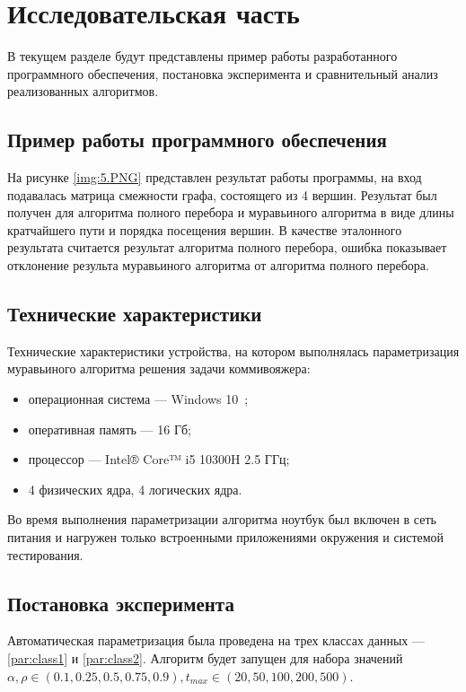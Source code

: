 \chapter{Исследовательская часть}
В текущем разделе будут представлены пример работы разработанного программного обеспечения, постановка эксперимента и сравнительный анализ реализованных алгоритмов.

\section{Пример работы программного обеспечения}

На рисунке \ref{img:5.PNG} представлен результат работы программы, на вход подавалась матрица смежности графа, состоящего из 4 вершин. Результат был получен для алгоритма полного перебора и муравьиного алгоритма в виде длины кратчайшего пути и порядка посещения вершин. В качестве эталонного результата считается результат алгоритма полного перебора, ошибка показывает отклонение результа муравьиного алгоритма от алгоритма полного перебора.

\clearpage

\section{Технические характеристики}

Технические характеристики устройства, на котором выполнялась параметризация муравьиного алгоритма решения задачи коммивояжера:

\begin{itemize}
	\item операционная система --- Windows 10~\cite{windows10};
	\item оперативная память --- 16 Гб;
	\item процессор --- Intel® Core™ i5 10300H 2.5 ГГц;
	\item 4 физических ядра, 4 логических ядра.
\end{itemize}

Во время выполнения параметризации алгоритма ноутбук был включен в сеть питания и нагружен только встроенными приложениями окружения и системой тестирования.

\section{Постановка эксперимента}

Автоматическая параметризация была проведена на трех классах данных --- \ref{par:class1} и \ref{par:class2}. Алгоритм будет запущен для набора значений $\alpha, \rho \in (0.1, 0.25, 0.5, 0.75, 0.9), t_{max} \in (20, 50, 100, 200, 500)$.

